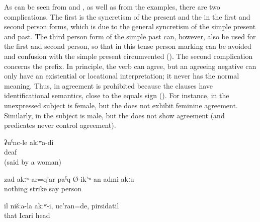 As can be seen from  and , as well as from the examples, there are two complications. The first is the syncretism of the present and the  in the first and second person forms, which is due to the general syncretism of the simple present and past. The third person form of the simple past can, however, also be used for the first and second person, so that in this tense person marking can be avoided and confusion with the simple present circumvented (). The second complication concerns the  prefix. In principle, the verb can agree, but an agreeing negative  can only have an existential or locational interpretation; it never has the normal  meaning. Thus, in   agreement is prohibited because the clauses have identificational semantics, close to the equals sign (\tit{=}). For instance, in  the unexpressed  subject is female, but the  does not exhibit feminine agreement. Similarly, in  the  subject is male, but the  does not show agreement (and  predicates never control agreement).
%
\begin{exe}
	\ex	\label{ex:I am not deaf}
	\gll	ʡuˁnc-le	akːʷa-di\\
		deaf	\\
	\glt	{} (said by a woman)

	\ex	\label{ex:He is not the person who beats without anything}
	\gll	zad	akːʷ-ar=q'ar	paˁq	Ø-ik'ʷ-an	admi	akːu\\
		nothing		strike	say	person	\\
	\glt	{}

	\ex	\label{ex:He was not one of us, he was Icari, the head (of the kolkhoz)}
	\gll	il	nišːa-la	akːʷ-i,		uc'ran=de,	pirsidatil\\
		that				Icari	head\\
	\glt	{}
\end{exe}

